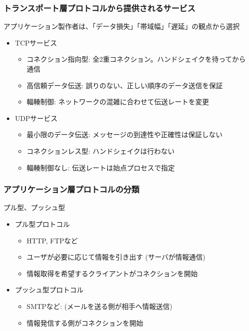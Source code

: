 \newpage
\subsubsection{トランスポート層プロトコルから提供されるサービス}

アプリケーション製作者は、「データ損失」「帯域幅」「遅延」の観点から選択

\begin{itemize}
  \item TCPサービス
  \begin{itemize}
    \item コネクション指向型: 全2重コネクション。ハンドシェイクを待ってから通信
    \item 高信頼データ伝送: 誤りのない、正しい順序のデータ送信を保証
    \item 輻輳制御: ネットワークの混雑に合わせて伝送レートを変更
  \end{itemize}
  \item UDPサービス
  \begin{itemize}
    \item 最小限のデータ伝送: メッセージの到達性や正確性は保証しない
    \item コネクションレス型: ハンドシェイクは行わない
    \item 輻輳制御なし: 伝送レートは始点プロセスで指定
  \end{itemize}
\end{itemize}

\subsubsection{アプリケーション層プロトコルの分類}

プル型、プッシュ型
\begin{itemize}
  \item プル型プロトコル
  \begin{itemize}
    \item HTTP, FTPなど
    \item ユーザが必要に応じて情報を引き出す (サーバが情報通信)
    \item 情報取得を希望するクライアントがコネクションを開始
    \end{itemize}
  \item プッシュ型プロトコル
  \begin{itemize}
    \item SMTPなど: (メールを送る側が相手へ情報送信)
    \item 情報発信する側がコネクションを開始
  \end{itemize}
\end{itemize}

